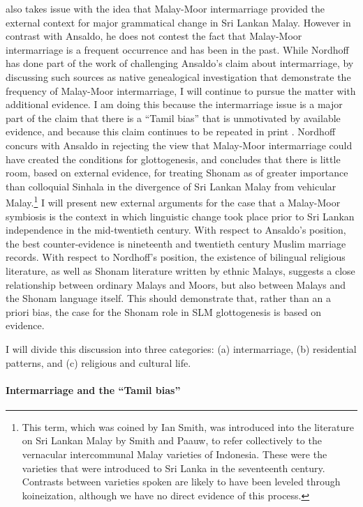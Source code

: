 \citet{Nordhoff2009} also takes issue with the idea that Malay-Moor intermarriage provided the external context for major grammatical change in Sri Lankan Malay. However in contrast with Ansaldo, he does not contest the fact that Malay-Moor intermarriage is a frequent occurrence and has been in the past. While Nordhoff has done part of the work of challenging Ansaldo's claim about intermarriage, by discussing such sources as native genealogical investigation that demonstrate the frequency of Malay-Moor intermarriage, I will continue to pursue the matter with additional evidence. I am doing this because the intermarriage issue is a major part of the claim that there is a ``Tamil bias'' that is unmotivated by available evidence, and because this claim continues to be repeated in print \citep{Ansaldo2011a}. Nordhoff concurs with Ansaldo in rejecting the view that Malay-Moor intermarriage could have created the conditions for glottogenesis, and concludes that there is little room, based on external evidence, for treating Shonam as of greater importance than colloquial Sinhala in the divergence of Sri Lankan Malay from vehicular Malay.\footnote{This
  term, which was coined by Ian Smith, was introduced into the literature on Sri Lankan Malay by Smith and Paauw, to refer collectively to the vernacular intercommunal Malay varieties of Indonesia. These were the varieties that were introduced to Sri Lanka in the seventeenth century. Contrasts between varieties spoken are likely to have been leveled through koineization, although we have no direct evidence of this process.}
I will present new external arguments for the case that a Malay-Moor symbiosis is the context in which linguistic change took place prior to Sri Lankan independence in the mid-twentieth century. With respect to Ansaldo's position, the best counter-evidence is nineteenth and twentieth century Muslim marriage records. With respect to Nordhoff's position, the existence of bilingual religious literature, as well as Shonam literature written by ethnic Malays, suggests a close relationship between ordinary Malays and Moors, but also between Malays and the Shonam language itself. This should demonstrate that, rather than an a priori bias, the case for the Shonam role in SLM glottogenesis is based on evidence.

I will divide this discussion into three categories: (a) intermarriage, (b) residential patterns, and (c) religious and cultural life.

\paragraph{Intermarriage and the ``Tamil bias''}%

